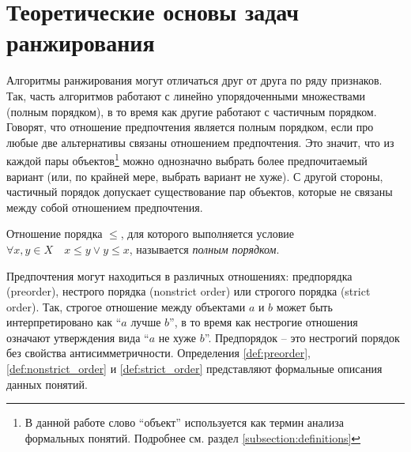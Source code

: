 \section{Теоретические основы задач ранжирования}

	Алгоритмы ранжирования могут отличаться друг от друга по ряду признаков. Так, часть алгоритмов работают с линейно упорядоченными множествами (полным порядком), в то время как другие работают с частичным порядком. Говорят, что отношение предпочтения является полным порядком, если про любые две альтернативы связаны отношением предпочтения. Это значит, что из каждой пары объектов\footnote{В данной работе слово \enquote{объект} используется как термин анализа формальных понятий. Подробнее см. раздел \ref{subsection:definitions}} можно однозначно выбрать более предпочитаемый вариант (или, по крайней мере, выбрать вариант не хуже). С другой стороны, частичный порядок допускает существование пар объектов, которые не связаны между собой отношением предпочтения. 
	\begin{definition}
		\label{def:total_order}
		Отношение порядка $\leq$, для которого выполняется условие
		$\forall x,y\in X \quad  x\leq y \vee y \leq x$,
		называется \emph{полным порядком}.
	\end{definition}
	
	Предпочтения могут находиться в различных отношениях: предпорядка (preorder), нестрого порядка (nonstrict order) или строгого порядка (strict order). Так, строгое отношение между объектами $a$ и $b$ может быть интерпретировано как \enquote{$a$ лучше $b$}, в то время как нестрогие отношения означают утверждения вида \enquote{$a$ не хуже $b$}\cite[с.~384]{Barten:1982}. Предпорядок – это нестрогий порядок без свойства антисимметричности. Определения \ref{def:preorder}, \ref{def:nonstrict_order} и \ref{def:strict_order} представляют формальные описания данных понятий.
	
